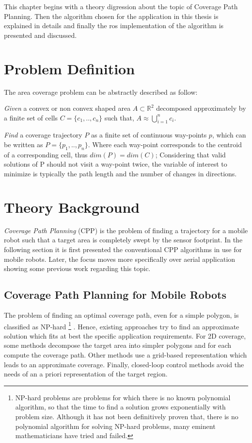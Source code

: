 This chapter begins with a theory digression about the topic of Coverage Path Planning. Then the algorithm chosen for the application in this thesis is explained in details and finally the \acrshort{ros} implementation of the algorithm is presented and discussed.
\section{Problem Definition} %
\label{sec:problem_definition}
The area coverage problem can be abstractly described as follow:\par 
\textit{Given} a convex or non convex shaped area $A \subset \mathbb{R}^2$ decomposed approximately by a finite set of cells $C = \{c_1, .., c_n\}$ such that, $A \approx \bigcup_{i=1}^{n} c_i$.\par
\textit{Find} a coverage trajectory $P$ as a finite set of continuous way-points $p$, which can be written as $P = \{p_1, .., p_n\}$. Where each way-point corresponds to the centroid of a corresponding cell, thus $dim(P) = dim(C)$;
Considering that valid solutions of P should not visit a way-point twice, the variable of interest to minimize is typically the path length and the number of changes in directions.
\section{Theory Background} %
\label{sec:theory_background}
\textit{Coverage Path Planning} (CPP) is the problem of finding a trajectory for a mobile robot such that a target area is completely swept by the sensor footprint. In the following section it is first presented the conventional CPP algorithms in use for mobile robots. Later, the focus moves more specifically over aerial application showing some previous work regarding this topic.

\subsection{Coverage Path Planning for Mobile Robots} %
\label{sub:coverage_path_planning_for_mobile_robots}
The problem of finding an optimal coverage path, even for a simple polygon, is classified as NP-hard \footnote{NP-hard problems are problems for which there is no known polynomial algorithm, so that the time to find a solution grows exponentially with problem size. Although it has not been definitively proven that, there is no polynomial algorithm for solving NP-hard problems, many eminent mathematicians have tried and failed.} \cite{ARKIN200025}. Hence, existing approaches try to find an approximate solution which fits at best the specific application requirements. For 2D coverage, some methods decompose the target area into simpler polygons and for each compute the coverage path. Other methods use a grid-based representation which leads to an approximate coverage. Finally, closed-loop control methods avoid the needs of an a priori representation of the target region.

